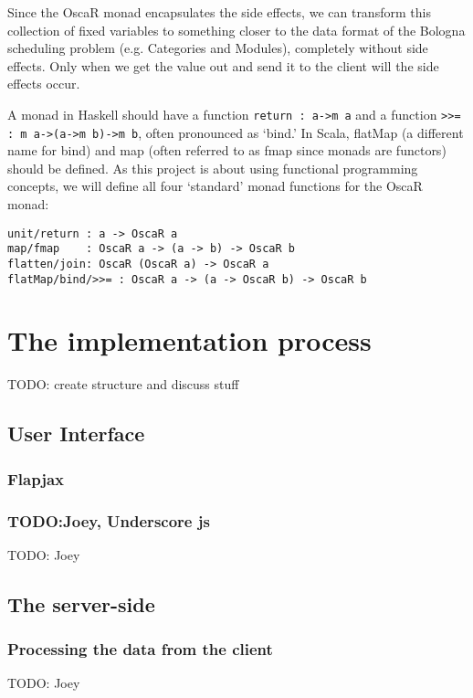 \documentclass[a4paper]{article}
\begin{document}
Since the OscaR monad encapsulates the side effects,
we can transform this collection of fixed variables to something closer to the
data format of the Bologna scheduling problem (e.g. Categories and Modules),
completely without side effects.
Only when we get the value out and send it to the client will the side effects occur.

A monad in Haskell should have a function \verb|return : a->m a| and a function
 \verb|>>= : m a->(a->m b)->m b|, often pronounced as `bind.'
In Scala, flatMap (a different name for bind) and 
map (often referred to as fmap since monads are functors) should be defined.
As this project is about using functional programming concepts, 
we will define all four `standard' monad functions for the OscaR monad:
\begin{verbatim}
unit/return : a -> OscaR a
map/fmap	: OscaR a -> (a -> b) -> OscaR b
flatten/join: OscaR (OscaR a) -> OscaR a
flatMap/bind/>>= : OscaR a -> (a -> OscaR b) -> OscaR b
\end{verbatim}

\section{The implementation process}
\label{sec:impl}
{\Large TODO:} create structure and discuss stuff

\subsection{User Interface}
\subsubsection{Flapjax}


\subsubsection{TODO:Joey, Underscore js}
{\Large TODO:} Joey


\subsection{The server-side}
\subsubsection{Processing the data from the client}
{\Large TODO:} Joey
\end{document}
